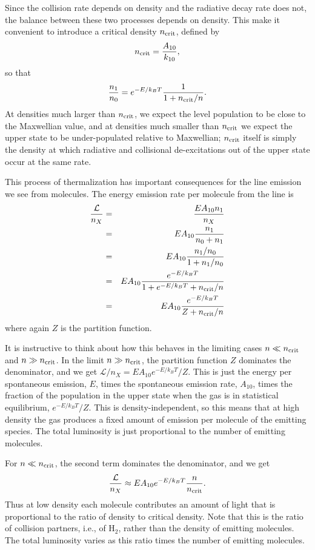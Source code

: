 Since the collision rate depends on density and the radiative decay rate does not, the balance between these two processes depends on density. This make it convenient to introduce a critical density $n_{\rm crit}$, defined by
\begin{equation}
\label{eq:ncrit}
n_{\rm crit} = \frac{A_{10}}{k_{10}},
\end{equation}
so that
\begin{equation}
\frac{n_1}{n_0} = e^{-E/k_B T} \frac{1}{1+n_{\rm crit}/n}.
\end{equation}
At densities much larger than $n_{\rm crit}$, we expect the level population to be close to the Maxwellian value, and at densities much smaller than $n_{\rm crit}$ we expect the upper state to be under-populated relative to Maxwellian; $n_{\rm crit}$ itself is simply the density at which radiative and collisional de-excitations out of the upper state occur at the same rate.

This process of thermalization has important consequences for the line emission we see from molecules. The energy emission rate per molecule from the line is 
\begin{eqnarray}
\frac{\mathcal{L}}{n_X} & = & \frac{E A_{10} n_1}{n_X} \\
& = & E A_{10} \frac{n_1}{n_0+n_1} \\
& = & E A_{10} \frac{n_1/n_0}{1+n_1/n_0} \\
& = & E A_{10} \frac{e^{-E/k_B T}}{1+e^{-E/k_B T}+n_{\rm crit}/n} \\
& = & E A_{10} \frac{e^{-E/k_B T}}{Z+n_{\rm crit}/n}
\end{eqnarray}
where again $Z$ is the partition function.

It is instructive to think about how this behaves in the limiting cases $n \ll n_{\rm crit}$ and $n\gg n_{\rm crit}$. In the limit $n\gg n_{\rm crit}$, the partition function $Z$ dominates the denominator, and we get $\mathcal{L}/n_X = E A_{10} e^{-E/k_B T}/Z$. This is just the energy per spontaneous emission, $E$, times the spontaneous emission rate, $A_{10}$, times the fraction of the population in the upper state when the gas is in statistical equilibrium, $e^{-E/k_B T}/Z$. This is density-independent, so this means that at high density the gas produces a fixed amount of emission per molecule of the emitting species. The total luminosity is just proportional to the number of emitting molecules.

For $n \ll n_{\rm crit}$, the second term dominates the denominator, and we get
\begin{equation}
\label{eq:cool_lowden}
\frac{\mathcal{L}}{n_X} \approx E A_{10} e^{-E/k_B T} \frac{n}{n_{\rm crit}}.
\end{equation}
Thus at low density each molecule contributes an amount of light that is proportional to the ratio of density to critical density. Note that this is the ratio of collision partners, i.e., of H$_2$, rather than the density of emitting molecules. The total luminosity varies as this ratio times the number of emitting molecules.

